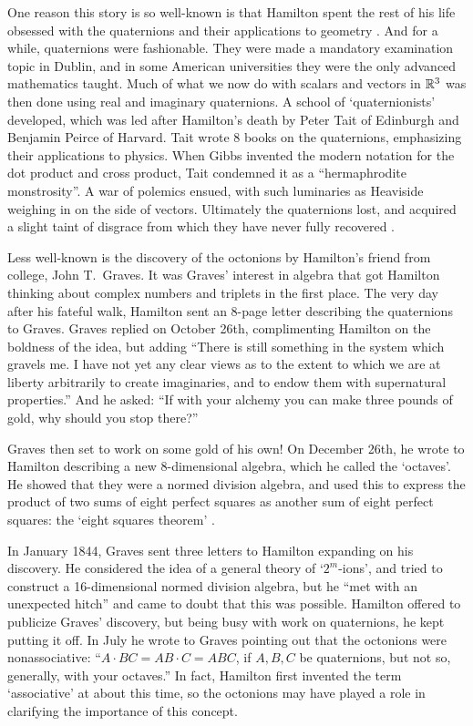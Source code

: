 One reason this story is so well-known is that Hamilton spent the rest   
of his life obsessed with the quaternions and their applications to   
geometry \cite{Graves,Hankins}.  And for a while, quaternions  were   
fashionable.  They were made a mandatory examination topic in Dublin,   
and in some American universities they were the only advanced   
mathematics taught.  Much of what we now do with scalars and vectors in   
${\mathbb R}^3$ was  then done using real and imaginary quaternions.   A school   
of `quaternionists' developed, which was led after Hamilton's death by   
Peter Tait of Edinburgh and Benjamin Peirce of Harvard.  Tait wrote 8   
books on the quaternions, emphasizing their applications to physics.    
When Gibbs invented the modern notation for the dot product and cross   
product, Tait condemned it as a ``hermaphrodite monstrosity''.  A war of   
polemics ensued, with such luminaries as Heaviside weighing   
in on the side of vectors.  Ultimately the quaternions lost, and   
acquired a slight taint of disgrace from which they have never fully   
recovered \cite{Crowe}.    
   
Less well-known is the discovery of the octonions by Hamilton's friend   
from college, John T.\ Graves.  It was Graves' interest in algebra that   
got Hamilton thinking about complex numbers and triplets in the first    
place.  The very day after his fateful walk, Hamilton sent an 8-page   
letter describing the quaternions to Graves.  Graves replied on October   
26th, complimenting Hamilton on the boldness of the idea, but adding   
``There is still something in the system which gravels me.  I have not   
yet any clear views as to the extent to which we are at liberty   
arbitrarily to create imaginaries, and to endow them with supernatural   
properties.''  And he asked: ``If with your alchemy you can make three   
pounds of gold, why should you stop there?''  

Graves then set to work on some gold of his own!  On December 26th,
he wrote to Hamilton describing a new 8-dimensional algebra, which he
called the `octaves'.   He showed that they were a normed division
algebra, and used this to express the product of two sums of eight
perfect squares as another sum of eight perfect squares: the `eight
squares theorem' \cite{Hamilton}. 

In January 1844, Graves sent three letters to Hamilton expanding on his   
discovery.  He considered the idea of a general theory of   
`$2^m$-ions', and tried to construct a 16-dimensional normed division   
algebra, but he ``met with an unexpected hitch'' and came to doubt that   
this was possible.  Hamilton offered to publicize Graves' discovery, but   
being busy with work on quaternions, he kept putting it off.  In July he   
wrote to Graves pointing out that the octonions were nonassociative:   
``$A \cdot BC = AB \cdot C = ABC$, if $A,B,C$ be quaternions, but not   
so, generally, with your octaves.''  In fact, Hamilton first invented   
the term `associative' at about this time, so the octonions may have   
played a role in clarifying the importance of this concept.    
   
